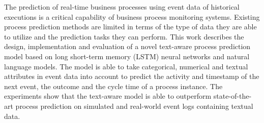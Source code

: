The prediction of real-time business processes using event data of historical executions is a critical capability of business process monitoring systems.
Existing process prediction methods are limited in terms of the type of data they are able to utilize and the prediction tasks they can perform.
This work describes the design, implementation and evaluation of a novel text-aware process prediction model based on long short-term memory (LSTM) neural networks and natural language models.
The model is able to take categorical, numerical and textual attributes in event data into account to predict the activity and timestamp of the next event, the outcome and the cycle time of a process instance.
The experiments show that the text-aware model is able to outperform state-of-the-art process prediction on simulated and real-world event logs containing textual data.